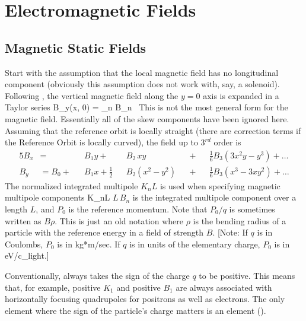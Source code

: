 \chapter{Electromagnetic Fields}

\section{Magnetic Static Fields}
\label{s:mag.field}

Start with the assumption that the local magnetic field has no
longitudinal component (obviously this assumption does not work with,
say, a solenoid).  Following \mad, the vertical magnetic field along
the $y = 0$ axis is expanded in a Taylor series
\Begineq
  B_y(x, 0) = \sum_n B_n \, 
  \label{byx0b}
\Endeq
This is not the most
general form for the magnetic field. Essentially all of the skew
components have been ignored here. Assuming that the
reference orbit is locally straight (there are correction terms if the
Reference Orbit is locally curved), the field up to $3^{rd}$ order is
\begin{alignat}{5}
  B_x &=           &&B_1 y \plus         &&B_2 \, xy       
                   && \plus && \frac{1}{6} B_3 (3x^2 y - y^3) \plus \ldots \\
  B_y &= B_0 \plus &&B_1 x + \frac{1}{2} &&B_2 (x^2 - y^2) 
                   && \plus && \frac{1}{6} B_3 (x^3 - 3x y^2) \plus \ldots
\end{alignat}
The normalized integrated multipole $K_nL$ is used when specifying magnetic
multipole components
\Begineq
  K_nL \equiv {}
\Endeq
$L \, B_n$ is the integrated multipole component over a length $L$,
and $P_0$ is the reference momentum. Note that $P_0/q$ is sometimes
written as $B\rho$. This is just an old notation where $\rho$ is the
bending radius of a particle with the reference energy in a field of
strength $B$. [Note: If $q$ is in Coulombs, $P_0$ is in
kg*m/sec. If $q$ is in units of the elementary charge, $P_0$ is in
eV/c_light.]

Conventionally, \bmad always takes the sign of the charge $q$ to be
positive. This means that, for example, positive $K_1$ and positive
$B_1$ are always associated with horizontally focusing quadrupoles for
positrons as well as electrons. The only element where the sign of the
particle's charge matters is an  element ().

